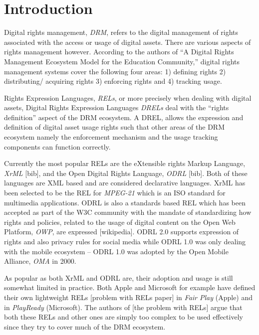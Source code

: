 \chapter{Introduction}
Digital rights management, \emph{DRM}, refers to the digital management of rights associated with the access or usage of digital assets. There are various aspects of rights management however. According to the authors of ``A Digital Rights Management Ecosystem Model for the Education Community,'' digital rights management systems cover the following four areas: 1) defining rights 2) distributing/ acquiring rights 3) enforcing rights and 4) tracking usage. 

Rights Expression Languages, \emph{RELs}, or more precisely when dealing with digital assets, Digital Rights Expression Languages \emph{DRELs} deal with the ``rights definition'' aspect of the DRM ecosystem. A DREL, allows the expression and definition of digital asset usage rights such that other areas of the DRM ecosystem namely the enforcement mechanism and the usage tracking components can function correctly.

Currently the most popular RELs are the eXtensible rights Markup Language, \emph{XrML} [bib], and the Open Digital Rights Language, \emph{ODRL} [bib]. Both of these languages are XML based and are considered declarative languages. XrML has been selected to be the REL for \emph{MPEG-21} which is an ISO standard for multimedia applications. ODRL is also a standards based REL which has been accepted as part of the W3C community with the mandate of standardizing how rights and policies, related to the usage of digital content on the Open Web Platform, \emph{OWP}, are expressed [wikipedia]. ODRL 2.0 supports expression of rights and also privacy rules for social media while ODRL 1.0 was only dealing with the mobile ecosystem -- ODRL 1.0 was adopted by the Open Mobile Alliance, \emph{OMA} in 2000.

As popular as both XrML and ODRL are, their adoption and usage is still somewhat limited in practice. Both Apple and Microsoft for example have defined their own lightweight RELs [problem with RELs paper] in \emph{Fair Play} (Apple) and in \emph{PlayReady} (Microsoft). The authors of [the problem with RELs] argue that both these RELs and other ones are simply too complex to be used effectively since they try to cover much of the DRM ecosystem. 

